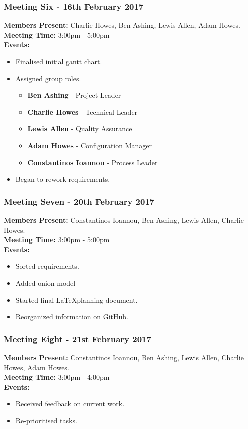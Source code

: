 \documentclass[a4paper]{article}
\begin{document}
\subsubsection*{Meeting Six - 16th February 2017}
\textbf{Members Present:} Charlie Howes, Ben Ashing, Lewis Allen, Adam Howes. \\
\textbf{Meeting Time:} 3:00pm - 5:00pm \\
\textbf{Events:} 
\begin{itemize}
    \item Finalised initial gantt chart.
    \item Assigned group roles.
    \begin{itemize}
        \item \textbf{Ben Ashing} - Project Leader
        \item \textbf{Charlie Howes} - Technical Leader
        \item \textbf{Lewis Allen} - Quality Assurance
        \item \textbf{Adam Howes} - Configuration Manager
        \item \textbf{Constantinos Ioannou} - Process Leader
    \end{itemize}
    \item Began to rework requirements.
\end{itemize}

\subsubsection*{Meeting Seven - 20th February 2017}
\textbf{Members Present:} Constantinos Ioannou, Ben Ashing, Lewis Allen, Charlie Howes. \\
\textbf{Meeting Time:} 3:00pm - 5:00pm \\
\textbf{Events:} 
\begin{itemize}
    \item Sorted requirements.
    \item Added onion model
    \item Started final \LaTeX planning document.
    \item Reorganized information on GitHub.
\end{itemize}

\subsubsection*{Meeting Eight - 21st February 2017}
\textbf{Members Present:} Constantinos Ioannou, Ben Ashing, Lewis Allen, Charlie Howes, Adam Howes. \\
\textbf{Meeting Time:} 3:00pm - 4:00pm \\
\textbf{Events:} 
\begin{itemize}
    \item Received feedback on current work.
    \item Re-prioritised tasks.
\end{itemize}
\end{document}
